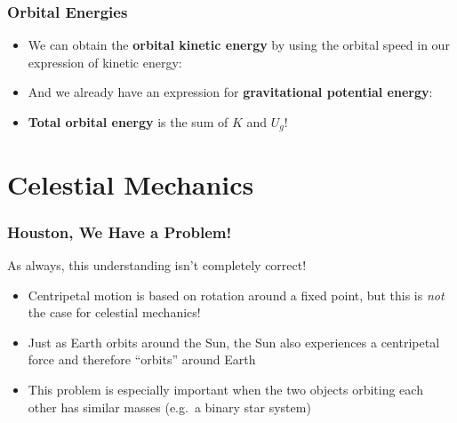\documentclass[12pt,compress,aspectratio=169]{beamer}
\begin{document}
\begin{frame}
  \frametitle{Orbital Energies}
  \begin{itemize}
  \item We can obtain the \textbf{orbital kinetic energy} by using the orbital
    speed in our expression of kinetic energy:

  \item And we already have an expression for
    \textbf{gravitational potential energy}:

  \item\textbf{Total orbital energy} is the sum of $K$ and $U_g$!

  \end{itemize}
\end{frame}





\section{Celestial Mechanics}


\begin{frame}
  \frametitle{Houston, We Have a Problem!}
  As always, this understanding isn't completely correct!
  \begin{itemize}
  \item Centripetal motion is based on rotation around a fixed point, but this
    is \emph{not} the case for celestial mechanics!
  \item Just as Earth orbits around the Sun, the Sun also experiences a
    centripetal force and therefore ``orbits'' around Earth
  \item This problem is especially important when the two objects orbiting each
    other has similar masses (e.g.\ a binary star system)
  \end{itemize}
\end{frame}
\end{document}
